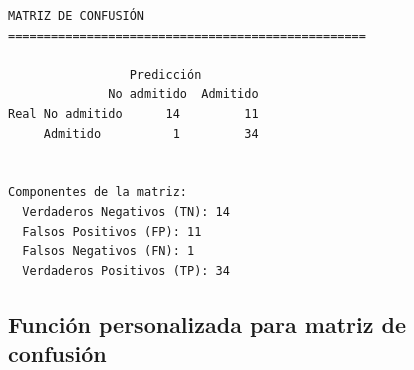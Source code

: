 \documentclass[
  doc,
  floatsintext,
  longtable,
  a4paper,
  nolmodern,
  notxfonts,
  notimes,
  12pt,
  colorlinks=true,linkcolor=blue,citecolor=blue,urlcolor=blue]{apa7}
\begin{document}
\begin{verbatim}
MATRIZ DE CONFUSIÓN
==================================================

                 Predicción
              No admitido  Admitido
Real No admitido      14         11
     Admitido          1         34


Componentes de la matriz:
  Verdaderos Negativos (TN): 14
  Falsos Positivos (FP): 11
  Falsos Negativos (FN): 1
  Verdaderos Positivos (TP): 34
\end{verbatim}

\subsection{Función personalizada para matriz de
confusión}\label{funciuxf3n-personalizada-para-matriz-de-confusiuxf3n}
\end{document}
